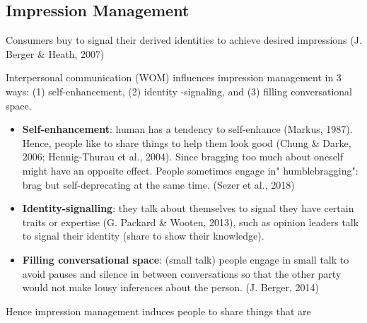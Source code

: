 \documentclass[
]{book}
\providecommand{\tightlist}{%
  \setlength{\itemsep}{0pt}\setlength{\parskip}{0pt}}
\begin{document}
\hypertarget{impression-management}{%
\subsection{Impression Management}\label{impression-management}}

Consumers buy to signal their derived identities to achieve desired impressions (J. Berger \& Heath, 2007)

Interpersonal communication (WOM) influences impression management in 3 ways: (1) self-enhancement, (2) identity -signaling, and (3) filling conversational space.

\begin{itemize}
\tightlist
\item
  \textbf{Self-enhancement}: human has a tendency to self-enhance (Markus, 1987). Hence, people like to share things to help them look good (Chung \& Darke, 2006; Hennig-Thurau et al., 2004). Since bragging too much about oneself might have an opposite effect. People sometimes engage in" humblebragging": brag but self-deprecating at the same time. (Sezer et al., 2018)
\item
  \textbf{Identity-signalling}: they talk about themselves to signal they have certain traits or expertise (G. Packard \& Wooten, 2013), such as opinion leaders talk to signal their identity (share to show their knowledge).
\item
  \textbf{Filling conversational space}: (small talk) people engage in small talk to avoid pauses and silence in between conversations so that the other party would not make lousy inferences about the person. (J. Berger, 2014)
\end{itemize}

Hence impression management induces people to share things that are
\end{document}
